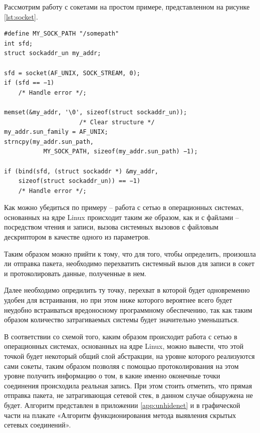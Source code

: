 \documentclass{gost7.32-2001}
\begin{document}
Рассмотрим работу с сокетами на простом примере, представленном на
рисунке \ref{lst:socket}.

\begin{lstlisting}[caption={Пример работы с сокетами},
    captionpos=b, float, label={lst:socket}]
#define MY_SOCK_PATH "/somepath"
int sfd;
struct sockaddr_un my_addr;

sfd = socket(AF_UNIX, SOCK_STREAM, 0);
if (sfd == −1)
    /* Handle error */;

memset(&my_addr, '\0', sizeof(struct sockaddr_un));
                     /* Clear structure */
my_addr.sun_family = AF_UNIX;
strncpy(my_addr.sun_path,
           MY_SOCK_PATH, sizeof(my_addr.sun_path) −1);

if (bind(sfd, (struct sockaddr *) &my_addr,
    sizeof(struct sockaddr_un)) == −1)
    /* Handle error */;
\end{lstlisting}

Как можно убедиться по примеру – работа с сетью в операционных
системах, основанных на ядре Linux происходит таким же образом, как и
с файлами – посредством чтения и записи, вызова системных вызовов с
файловым дескриптором в качестве одного из параметров.

Таким образом можно прийти к тому, что для того, чтобы определить,
произошла ли отправка пакета, необходимо перехватить
 системный вызов для записи в сокет и
протоколировать данные, полученные в нем.

Далее необходимо опредилить ту точку, перехват в которой будет
одновременно удобен для встраивания, но при этом ниже которого
вероятнее всего будет неудобно встраиваться вредоносному программному
обеспечению, так как таким образом количество затрагиваемых системы
будет значительно уменьшаться.


В соответствии со схемой того, каким образом происходит работа с сетью
в операционных системах, основанных на ядре Linux, можно вывести, что
этой точкой будет некоторый общий слой абстракции, на уровне которого
реализуются сами сокеты, таким образом позволяя с помощью
протоколирования на этом уровне получить информацию о том, в какие
именно оконечные точки соединения происходила реальная запись. При
этом стоить отметить, что прямая отправка пакета, не затрагивающая
сетевой стек, в данном случае обнаружена не будет. Алгоритм
представлен в приложении \ref{app:unhidenet} и в графической части на
плакате «Алгоритм функционирования метода выявления скрытых сетевых
соединений».
\end{document}
